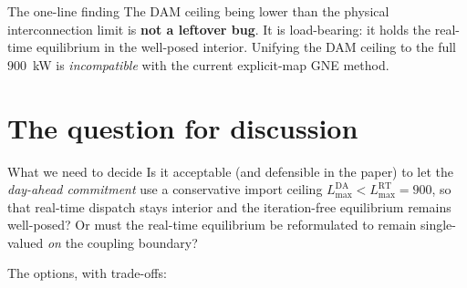 \documentclass[11pt, letterpaper]{article}
\begin{document}
\begin{kbox}{The one-line finding}
The DAM ceiling being lower than the physical interconnection limit is \textbf{not a leftover bug}.
It is load-bearing: it holds the real-time equilibrium in the well-posed interior. Unifying the DAM
ceiling to the full $900$~kW is \emph{incompatible} with the current explicit-map GNE method.
\end{kbox}

\section{The question for discussion}
\begin{qbox}{What we need to decide}
Is it acceptable (and defensible in the paper) to let the \emph{day-ahead commitment} use a
conservative import ceiling $L_{\max}^{\mathrm{DA}}<L_{\max}^{\mathrm{RT}}=900$, so that real-time
dispatch stays interior and the iteration-free equilibrium remains well-posed? Or must the real-time
equilibrium be reformulated to remain single-valued \emph{on} the coupling boundary?
\end{qbox}

\noindent The options, with trade-offs:
\end{document}
